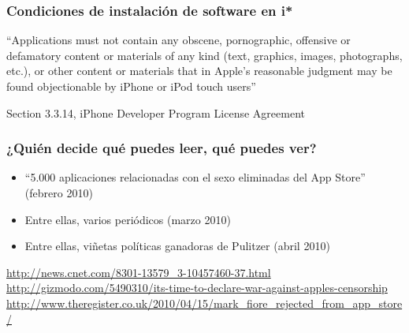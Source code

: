 \documentclass[17pt,aspectratio=169]{beamer}
\begin{document}
\begin{frame}
\frametitle{Condiciones de instalación de software en i*}

``Applications must not contain any obscene, pornographic, offensive or defamatory content or materials of any kind (text, graphics, images, photographs, etc.), or other content or materials that in Apple's reasonable judgment may be found objectionable by iPhone or iPod touch users''

\begin{flushright}
  {\footnotesize
    Section 3.3.14, iPhone Developer Program License Agreement
    }
\end{flushright}
\end{frame}


\begin{frame}
\frametitle{¿Quién decide qué puedes leer, qué puedes ver?}

\begin{itemize}
\item``5.000 aplicaciones relacionadas con el sexo eliminadas del App Store''  (febrero 2010)
  
\item Entre ellas, varios periódicos (marzo 2010)\\

\item Entre ellas, viñetas políticas ganadoras de Pulitzer (abril 2010)\\
\end{itemize}

  \begin{flushright}
    {\tiny
      \url{http://news.cnet.com/8301-13579_3-10457460-37.html}\\
      \url{http://gizmodo.com/5490310/its-time-to-declare-war-against-apples-censorship}\\
      \url{http://www.theregister.co.uk/2010/04/15/mark_fiore_rejected_from_app_store/}\\
    }
  \end{flushright}

\end{frame}

\end{document}
